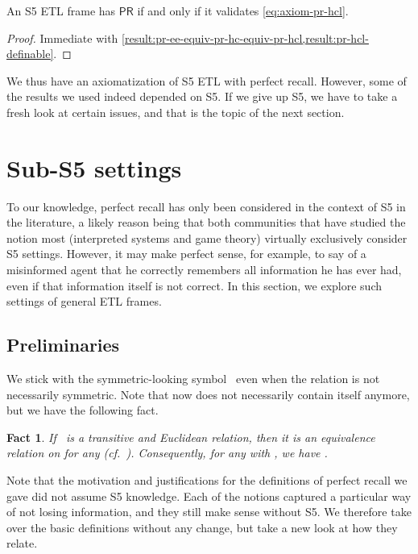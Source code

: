 \documentclass{article}
\newcommand{\PR}{\ensuremath{\mathsf{PR}}\xspace}
\newcommand{\tiff}{if and only if\xspace}
\newcounter{#1}
\newtheorem{fact}{Fact}[section]
\newtheorem{fact}{Fact}
\begin{document}
\begin{corollary}
  \label{result:pr-definable}
  An S5 ETL frame has \PR \tiff it validates \eqref{eq:axiom-pr-hcl}.
\end{corollary}
\begin{proof}
  Immediate with \cref{result:pr-ee-equiv-pr-hc-equiv-pr-hcl,result:pr-hcl-definable}.
\end{proof}

We thus have an axiomatization of S5 ETL with perfect recall.
However, some of the results we used indeed depended on S5.
If we give up S5, we have to take a fresh look at certain issues,
and that is the topic of the next section.

\section{Sub-S5 settings}
\label{sec:sub-s5-settings}

To our knowledge, perfect recall has only been considered in the context of S5 in the literature,
a likely reason being that both communities that have studied the notion most
(interpreted systems and game theory)
virtually exclusively consider S5 settings.
However, it may make perfect sense, for example,
to say of a misinformed agent that he correctly remembers all information he has ever had,
even if that information itself is not correct.
In this section, we explore such settings of general ETL frames.

\subsection{Preliminaries}
\label{sec:preliminaries}

We stick with the symmetric-looking symbol~ even when the relation is not necessarily symmetric.
Note that  now does not necessarily contain  itself anymore,
but we have the following fact.
\begin{fact}
  \label{result:trans-eucl-eq-class}
  If~ is a transitive and Euclidean relation,
  then it is an equivalence relation on  for any 
  (cf.~\cite[Theorem~3.3]{halpern_relationship_1991}).
  Consequently, for any  with ,
  we have .
\end{fact}

\medskip

Note that the motivation and justifications for the definitions of perfect recall we gave
did not assume S5 knowledge.
Each of the notions captured a particular way of not losing information,
and they still make sense without S5.
We therefore take over the basic definitions without any change,
but take a new look at how they relate.
\end{document}
